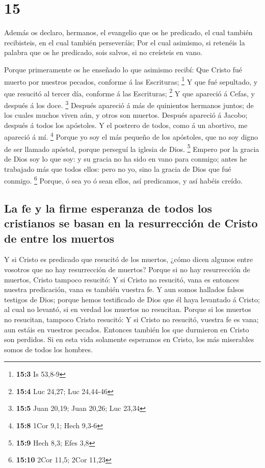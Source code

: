 \hypertarget{section-14}{%
\section{15}\label{section-14}}

 Además os declaro, hermanos, el evangelio que os he
predicado, el cual también recibisteis, en el cual también perseveráis;
 Por el cual asimismo, si retenéis la palabra que os he
predicado, sois salvos, si no creísteis en vano.

 Porque primeramente os he enseñado lo que asimismo recibí:
Que Cristo fué muerto por nuestros pecados, conforme á las Escrituras;
\footnote{\textbf{15:3} Is 53,8-9}  Y que fué sepultado, y
que resucitó al tercer día, conforme á las Escrituras; \footnote{\textbf{15:4}
  Luc 24,27; Luc 24,44-46}  Y que apareció á Cefas, y
después á los doce. \footnote{\textbf{15:5} Juan 20,19; Juan 20,26; Luc
  23,34}  Después apareció á más de quinientos hermanos
juntos; de los cuales muchos viven aún, y otros son muertos.
 Después apareció á Jacobo; después á todos los apóstoles.
 Y el postrero de todos, como á un abortivo, me apareció á
mí. \footnote{\textbf{15:8} 1Cor 9,1; Hech 9,3-6}  Porque yo
soy el más pequeño de los apóstoles, que no soy digno de ser llamado
apóstol, porque perseguí la iglesia de Dios. \footnote{\textbf{15:9}
  Hech 8,3; Efes 3,8}  Empero por la gracia de Dios soy lo
que soy: y su gracia no ha sido en vano para conmigo; antes he trabajado
más que todos ellos: pero no yo, sino la gracia de Dios que fué conmigo.
\footnote{\textbf{15:10} 2Cor 11,5; 2Cor 11,23}  Porque, ó
sea yo ó sean ellos, así predicamos, y así habéis creído.

\hypertarget{la-fe-y-la-firme-esperanza-de-todos-los-cristianos-se-basan-en-la-resurrecciuxf3n-de-cristo-de-entre-los-muertos}{%
\subsection{La fe y la firme esperanza de todos los cristianos se basan
en la resurrección de Cristo de entre los
muertos}\label{la-fe-y-la-firme-esperanza-de-todos-los-cristianos-se-basan-en-la-resurrecciuxf3n-de-cristo-de-entre-los-muertos}}

 Y si Cristo es predicado que resucitó de los muertos,
¿cómo dicen algunos entre vosotros que no hay resurrección de muertos?
 Porque si no hay resurrección de muertos, Cristo tampoco
resucitó:  Y si Cristo no resucitó, vana es entonces
nuestra predicación, vana es también vuestra fe.  Y aun
somos hallados falsos testigos de Dios; porque hemos testificado de Dios
que él haya levantado á Cristo; al cual no levantó, si en verdad los
muertos no resucitan.  Porque si los muertos no resucitan,
tampoco Cristo resucitó:  Y si Cristo no resucitó, vuestra
fe es vana; aun estáis en vuestros pecados.  Entonces
también los que durmieron en Cristo son perdidos.  Si en
esta vida solamente esperamos en Cristo, los más miserables somos de
todos los hombres.

